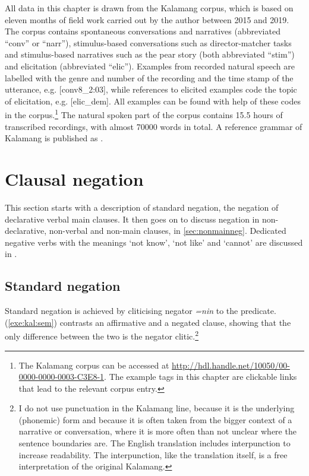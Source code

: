 \documentclass[output=paper,colorlinks,citecolor=brown,draft]{langscibook}
\begin{document}
\largerpage
All data in this chapter is drawn from the Kalamang corpus, which is based on eleven months of field work carried out by the author between 2015 and 2019. The corpus contains spontaneous conversations and narratives (abbreviated “conv” or “narr”), stimulus-based conversations such as director-matcher tasks and stimulus-based narratives such as the pear story (both abbreviated “stim”) and elicitation (abbreviated “elic”). Examples from recorded natural speech are labelled with the genre and number of the recording and the time stamp of the utterance, e.g. [conv8\_2:03], while references to elicited examples code the topic of elicitation, e.g. [elic\_dem]. All examples can be found with help of these codes in the corpus.\footnote{The Kalamang corpus can be accessed at \url{ http://hdl.handle.net/10050/00-0000-0000-0003-C3E8-1}. The example tags in this chapter are clickable links that lead to the relevant corpus entry.} The natural spoken part of the corpus contains 15.5 hours of transcribed recordings, with almost 70000 words in total. A reference grammar of Kalamang is published as \citet{Visser2022}.


\section{Clausal negation}
\largerpage
\label{sec:ninneg}
This section starts with a description of standard negation, the negation of declarative verbal main clauses. It then goes on to discuss negation in non-declarative, non-verbal and non-main clauses, in \textendash\ref{sec:nonmainneg}. Dedicated negative verbs with the meanings `not know', `not like' and `cannot' are discussed in .

\subsection{Standard negation}
\label{sec:standneg}
Standard negation is achieved by cliticising negator \textit{=nin} to the predicate. (\ref{exe:kal:sem}) contrasts an affirmative and a negated clause, showing that the only difference between the two is the negator clitic.\footnote{I do not use punctuation in the Kalamang line, because it is the underlying (phonemic) form and because it is often taken from the bigger context of a narrative or conversation, where it is more often than not unclear where the sentence boundaries are. The English translation includes interpunction to increase readability. The interpunction, like the translation itself, is a free interpretation of the original Kalamang.} 
\end{document}
